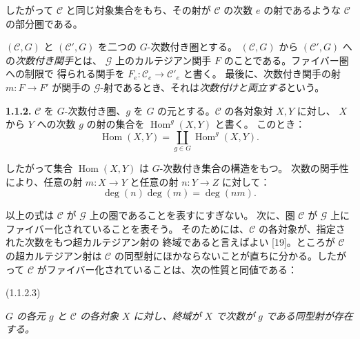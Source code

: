 \clearpage
{}%
%
したがって $\mathcal C$ と同じ対象集合をもち、その射が $\mathcal C$ の次数
$e$ の射であるような $\mathcal C$ の部分圏である。

$(\mathcal C,G)$ と $(\mathcal C',G)$ を二つの $G$-次数付き圏とする。
$(\mathcal C,G)$ から $(\mathcal C',G)$ への\emph{次数付き関手}とは、
$\mathcal G$ 上のカルテジアン関手 $F$ のことである。ファイバー圏への制限で
得られる関手を $F_e\colon\mathcal C_e\to\mathcal C'_e$ と書く。
最後に、次数付き関手の射 $m\colon F\to F'$ が関手の
$\mathcal G$-射であるとき、それは\emph{次数付けと両立する}という。

\noindent\textbf{1.1.2.}\quad
$\mathcal C$ を $G$-次数付き圏、$g$ を $G$ の元とする。$\mathcal C$ の各対象対
$X,Y$ に対し、
%
$X$ から $Y$ への次数 $g$ の射の集合を $\operatorname{Hom}^{g}(X,Y)$ と書く。
このとき：
\begingroup
\makeatletter
\tagsleft@true
\let\veqno\@@leqno
\makeatother
\begin{equation}
  \operatorname{Hom}(X,Y)
  =\coprod_{g\in G}\operatorname{Hom}^{g}(X,Y).
  \tag{1.1.2.1}
\end{equation}
\endgroup

したがって集合 $\operatorname{Hom}(X,Y)$ は $G$-次数付き集合の構造をもつ。
次数の関手性により、任意の射 $m\colon X\to Y$ と任意の射
$n\colon Y\to Z$ に対して：
\begin{equation}
  \deg(n)\deg(m)=\deg(nm).
  \tag{1.1.2.2}
\end{equation}

以上の式は $\mathcal C$ が $\mathcal G$ 上の圏であることを表すにすぎない。
次に、圏 $\mathcal C$ が $\mathcal G$ 上にファイバー化されていることを表そう。
そのためには、$\mathcal C$ の各対象が、指定された次数をもつ超カルテジアン射の
終域であると言えばよい [19]。ところが $\mathcal C$ の超カルテジアン射は
$\mathcal C$ の同型射にほかならないことが直ちに分かる。したがって
$\mathcal C$ がファイバー化されていることは、次の性質と同値である：

\noindent\textnormal{(1.1.2.3)}\quad
\begin{minipage}[t]{0.78\textwidth}
\emph{$G$ の各元 $g$ と $\mathcal C$ の各対象 $X$ に対し、終域が $X$ で次数が
$g$ である同型射が存在する。}
\end{minipage}
\par\medskip

